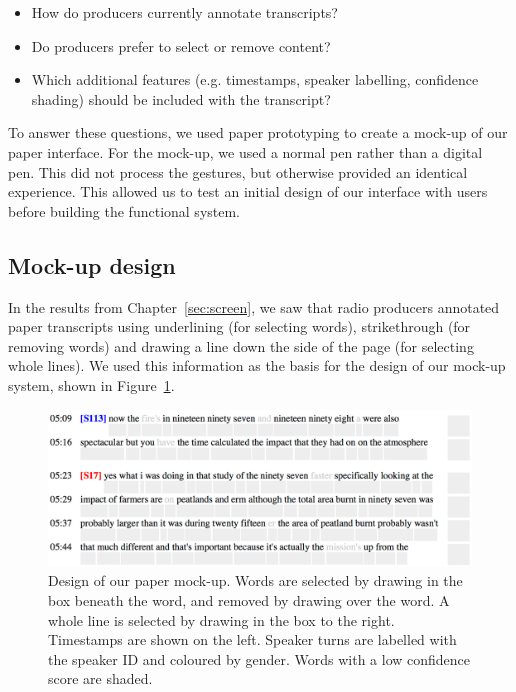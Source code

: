   \begin{itemize}
    \item How do producers currently annotate transcripts?
    \item Do producers prefer to select or remove content?
    \item Which additional features (e.g.  timestamps, speaker labelling, confidence shading) should be included with
          the transcript?
  \end{itemize}

To answer these questions, we used paper prototyping to create a mock-up of our paper interface. For the mock-up, we
used a normal pen rather than a digital pen. This did not process the gestures, but otherwise provided an identical
experience.  This allowed us to test an initial design of our interface with users before building the functional
system.





\subsection{Mock-up design}

In the results from Chapter~\ref{sec:screen}, we saw that radio producers annotated paper transcripts using underlining
(for selecting words), strikethrough (for removing words) and drawing a line down the side of the page (for selecting
whole lines).  We used this information as the basis for the design of our mock-up system, shown in
Figure~\ref{fig:paper-prototype-design}.

\begin{figure}[h]
  \centering
  \includegraphics[width=\columnwidth]{figs/paper-prototype-design.png}
  \caption[Design of our paper mock-up.]{Design of our paper mock-up.  Words are selected by drawing in the box beneath
  the word, and removed by drawing over the word. A whole line is selected by drawing in the box to the right.
Timestamps are shown on the left.  Speaker turns are labelled with the speaker ID and coloured by gender. Words with a
low confidence score are shaded.}
  \label{fig:paper-prototype-design}
\end{figure}

